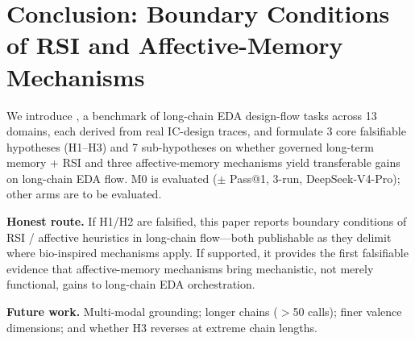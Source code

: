 \section{Conclusion: Boundary Conditions of RSI and Affective-Memory Mechanisms}
\label{sec:conclusion}

We introduce \bench{}, a benchmark of \Ncases{} long-chain EDA design-flow tasks across 13 domains, each derived from real IC-design traces, and formulate 3 core falsifiable hypotheses (H1--H3) and 7 sub-hypotheses on whether governed long-term memory + RSI and three affective-memory mechanisms yield transferable gains on long-chain EDA flow. M0 is evaluated (\MzeroPass{}$\pm$\MzeroStd{} Pass@1, 3-run, DeepSeek-V4-Pro); other arms are to be evaluated.

\textbf{Honest route.} If H1/H2 are falsified, this paper reports boundary conditions of RSI / affective heuristics in long-chain flow---both publishable as they delimit where bio-inspired mechanisms apply. If supported, it provides the first falsifiable evidence that affective-memory mechanisms bring mechanistic, not merely functional, gains to long-chain EDA orchestration.

\textbf{Future work.} Multi-modal grounding; longer chains ($>$50 calls); finer valence dimensions; and whether H3 reverses at extreme chain lengths.

